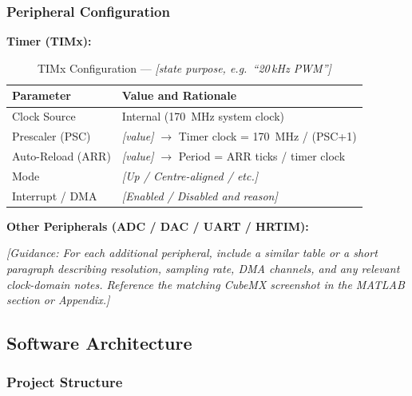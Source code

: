 
\subsubsection{Peripheral Configuration}

\textbf{\textcolor{stmblue}{Timer (TIMx):}}

\begin{table}[H]
    \centering
    \caption{TIMx Configuration --- \textit{[state purpose, e.g.\ ``20\,kHz PWM'']}}
    \label{tab:timer_config}
    \begin{tabularx}{\textwidth}{|l|X|}
        \hline
        \textbf{Parameter} & \textbf{Value and Rationale} \\
        \hline
        Clock Source    & Internal (\SI{170}{MHz} system clock) \\
        \hline
        Prescaler (PSC) & \textit{[value]} $\rightarrow$ Timer clock = \SI{170}{MHz} / (PSC+1) \\
        \hline
        Auto-Reload (ARR) & \textit{[value]} $\rightarrow$ Period = ARR ticks / timer clock \\
        \hline
        Mode            & \textit{[Up / Centre-aligned / etc.]} \\
        \hline
        Interrupt / DMA & \textit{[Enabled / Disabled and reason]} \\
        \hline
    \end{tabularx}
\end{table}

\textbf{\textcolor{stmblue}{Other Peripherals (ADC / DAC / UART / HRTIM):}}

\textit{[Guidance: For each additional peripheral, include a
similar table or a short paragraph describing resolution, sampling
rate, DMA channels, and any relevant clock-domain notes.
Reference the matching CubeMX screenshot in the MATLAB section
or Appendix.]}

\subsection{Software Architecture}

\subsubsection{Project Structure}

